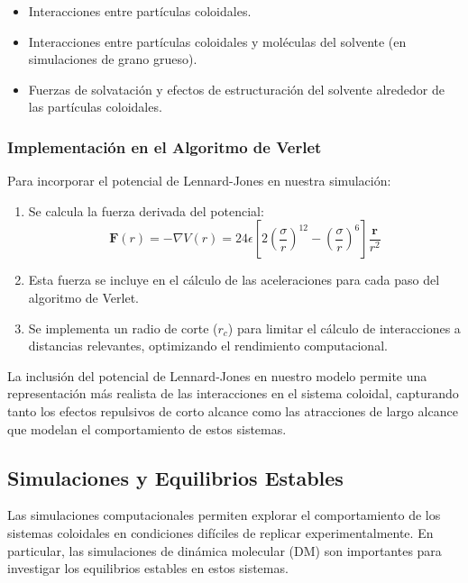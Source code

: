 \documentclass[twocolumn]{article}
\begin{document}
\begin{itemize}
    \item Interacciones entre partículas coloidales.
    \item Interacciones entre partículas coloidales y moléculas del solvente (en simulaciones de grano grueso).
    \item Fuerzas de solvatación y efectos de estructuración del solvente alrededor de las partículas coloidales.
\end{itemize}

\subsubsection*{Implementación en el Algoritmo de Verlet}
Para incorporar el potencial de Lennard-Jones en nuestra simulación:

\begin{enumerate}
    \item Se calcula la fuerza derivada del potencial:
    \begin{equation}
        \mathbf{F}(r) = -\nabla V(r) = 24\epsilon \left[ 2\left(\frac{\sigma}{r}\right)^{12} - \left(\frac{\sigma}{r}\right)^{6} \right] \frac{\mathbf{r}}{r^2}
    \end{equation}
    \item Esta fuerza se incluye en el cálculo de las aceleraciones para cada paso del algoritmo de Verlet.
    \item Se implementa un radio de corte ($r_c$) para limitar el cálculo de interacciones a distancias relevantes, optimizando el rendimiento computacional.
\end{enumerate}

La inclusión del potencial de Lennard-Jones en nuestro modelo permite una representación más realista de las interacciones en el sistema coloidal, capturando tanto los efectos repulsivos de corto alcance como las atracciones de largo alcance que modelan el comportamiento de estos sistemas.

\subsection*{Simulaciones y Equilibrios Estables}
Las simulaciones computacionales permiten explorar el comportamiento de los sistemas coloidales en condiciones difíciles de replicar experimentalmente. En particular, las simulaciones de dinámica molecular (DM) son importantes para investigar los equilibrios estables en estos sistemas.
\end{document}
